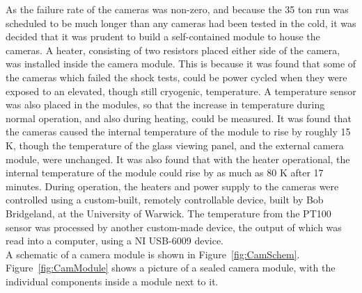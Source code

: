 As the failure rate of the cameras was non-zero, and because the 35 ton run was scheduled to be much longer than any cameras had been tested in the cold, it was decided that it was prudent to build a self-contained module to house the cameras. A heater, consisting of two resistors placed either side of the camera, was installed inside the camera module. This is because it was found that some of the cameras which failed the shock tests, could be power cycled when they were exposed to an elevated, though still cryogenic, temperature. A temperature sensor was also placed in the modules, so that the increase in temperature during normal operation, and also during heating, could be measured. It was found that the cameras caused the internal temperature of the module to rise by roughly 15 K, though the temperature of the glass viewing panel, and the external camera module, were unchanged. It was also found that with the heater operational, the internal temperature of the module could rise by as much as 80 K after 17 minutes. During operation, the heaters and power supply to the cameras were controlled using a custom-built, remotely controllable device, built by Bob Bridgeland, at the University of Warwick. The temperature from the PT100 sensor was processed by another custom-made device, the output of which was read into a computer, using a NI USB-6009 device. \\

A schematic of a camera module is shown in Figure~\ref{fig:CamSchem}. Figure~\ref{fig:CamModule} shows a picture of a sealed camera module, with the individual components inside a module next to it. \\

